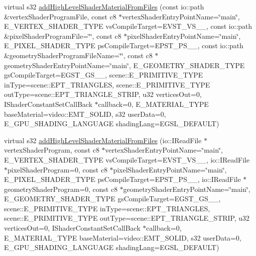 \begin{DoxyCompactItemize}
virtual s32 \hyperlink{classirr_1_1video_1_1_c_null_driver_a8b5d2aaf3363372f9dfb83de487f4774}{add\-High\-Level\-Shader\-Material\-From\-Files} (const io\-::path \&vertex\-Shader\-Program\-File, const c8 $\ast$vertex\-Shader\-Entry\-Point\-Name=\char`\"{}main\char`\"{}, E\-\_\-\-V\-E\-R\-T\-E\-X\-\_\-\-S\-H\-A\-D\-E\-R\-\_\-\-T\-Y\-P\-E vs\-Compile\-Target=E\-V\-S\-T\-\_\-\-V\-S\-\_\-\_, const io\-::path \&pixel\-Shader\-Program\-File=\char`\"{}\char`\"{}, const c8 $\ast$pixel\-Shader\-Entry\-Point\-Name=\char`\"{}main\char`\"{}, E\-\_\-\-P\-I\-X\-E\-L\-\_\-\-S\-H\-A\-D\-E\-R\-\_\-\-T\-Y\-P\-E ps\-Compile\-Target=E\-P\-S\-T\-\_\-\-P\-S\-\_\-\_, const io\-::path \&geometry\-Shader\-Program\-File\-Name=\char`\"{}\char`\"{}, const c8 $\ast$geometry\-Shader\-Entry\-Point\-Name=\char`\"{}main\char`\"{}, E\-\_\-\-G\-E\-O\-M\-E\-T\-R\-Y\-\_\-\-S\-H\-A\-D\-E\-R\-\_\-\-T\-Y\-P\-E gs\-Compile\-Target=E\-G\-S\-T\-\_\-\-G\-S\-\_\-\_, scene\-::\-E\-\_\-\-P\-R\-I\-M\-I\-T\-I\-V\-E\-\_\-\-T\-Y\-P\-E in\-Type=scene\-::\-E\-P\-T\-\_\-\-T\-R\-I\-A\-N\-G\-L\-E\-S, scene\-::\-E\-\_\-\-P\-R\-I\-M\-I\-T\-I\-V\-E\-\_\-\-T\-Y\-P\-E out\-Type=scene\-::\-E\-P\-T\-\_\-\-T\-R\-I\-A\-N\-G\-L\-E\-\_\-\-S\-T\-R\-I\-P, u32 vertices\-Out=0, I\-Shader\-Constant\-Set\-Call\-Back $\ast$callback=0, E\-\_\-\-M\-A\-T\-E\-R\-I\-A\-L\-\_\-\-T\-Y\-P\-E base\-Material=video\-::\-E\-M\-T\-\_\-\-S\-O\-L\-I\-D, s32 user\-Data=0, E\-\_\-\-G\-P\-U\-\_\-\-S\-H\-A\-D\-I\-N\-G\-\_\-\-L\-A\-N\-G\-U\-A\-G\-E shading\-Lang=E\-G\-S\-L\-\_\-\-D\-E\-F\-A\-U\-L\-T)
\item 
virtual s32 \hyperlink{classirr_1_1video_1_1_c_null_driver_a371c10d225026a4a9d1efd637cf799b2}{add\-High\-Level\-Shader\-Material\-From\-Files} (io\-::\-I\-Read\-File $\ast$vertex\-Shader\-Program, const c8 $\ast$vertex\-Shader\-Entry\-Point\-Name=\char`\"{}main\char`\"{}, E\-\_\-\-V\-E\-R\-T\-E\-X\-\_\-\-S\-H\-A\-D\-E\-R\-\_\-\-T\-Y\-P\-E vs\-Compile\-Target=E\-V\-S\-T\-\_\-\-V\-S\-\_\-\_, io\-::\-I\-Read\-File $\ast$pixel\-Shader\-Program=0, const c8 $\ast$pixel\-Shader\-Entry\-Point\-Name=\char`\"{}main\char`\"{}, E\-\_\-\-P\-I\-X\-E\-L\-\_\-\-S\-H\-A\-D\-E\-R\-\_\-\-T\-Y\-P\-E ps\-Compile\-Target=E\-P\-S\-T\-\_\-\-P\-S\-\_\-\_, io\-::\-I\-Read\-File $\ast$geometry\-Shader\-Program=0, const c8 $\ast$geometry\-Shader\-Entry\-Point\-Name=\char`\"{}main\char`\"{}, E\-\_\-\-G\-E\-O\-M\-E\-T\-R\-Y\-\_\-\-S\-H\-A\-D\-E\-R\-\_\-\-T\-Y\-P\-E gs\-Compile\-Target=E\-G\-S\-T\-\_\-\-G\-S\-\_\-\_, scene\-::\-E\-\_\-\-P\-R\-I\-M\-I\-T\-I\-V\-E\-\_\-\-T\-Y\-P\-E in\-Type=scene\-::\-E\-P\-T\-\_\-\-T\-R\-I\-A\-N\-G\-L\-E\-S, scene\-::\-E\-\_\-\-P\-R\-I\-M\-I\-T\-I\-V\-E\-\_\-\-T\-Y\-P\-E out\-Type=scene\-::\-E\-P\-T\-\_\-\-T\-R\-I\-A\-N\-G\-L\-E\-\_\-\-S\-T\-R\-I\-P, u32 vertices\-Out=0, I\-Shader\-Constant\-Set\-Call\-Back $\ast$callback=0, E\-\_\-\-M\-A\-T\-E\-R\-I\-A\-L\-\_\-\-T\-Y\-P\-E base\-Material=video\-::\-E\-M\-T\-\_\-\-S\-O\-L\-I\-D, s32 user\-Data=0, E\-\_\-\-G\-P\-U\-\_\-\-S\-H\-A\-D\-I\-N\-G\-\_\-\-L\-A\-N\-G\-U\-A\-G\-E shading\-Lang=E\-G\-S\-L\-\_\-\-D\-E\-F\-A\-U\-L\-T)

\end{DoxyCompactItemize}
